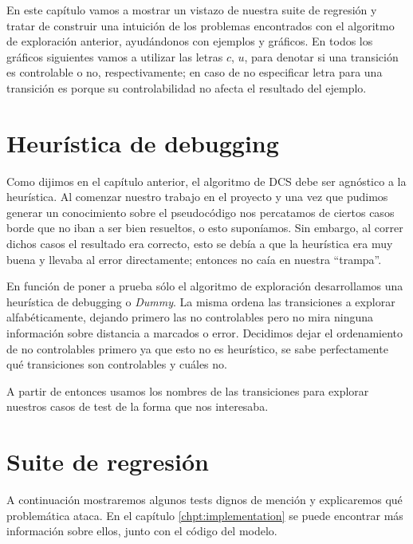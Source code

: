 En este capítulo vamos a mostrar un vistazo de nuestra suite de regresión y tratar de construir una intuición de los problemas encontrados con el algoritmo de exploración anterior, ayudándonos con ejemplos y gráficos. En todos los gráficos siguientes vamos a utilizar las letras $c$, $u$, para denotar si una transición es controlable o no, respectivamente; en caso de no especificar letra para una transición es porque su controlabilidad no afecta el resultado del ejemplo.

\section{Heurística de debugging}
Como dijimos en el capítulo anterior, el algoritmo de DCS debe ser agnóstico a la heurística. Al comenzar nuestro trabajo en el proyecto y una vez que pudimos generar un conocimiento sobre el pseudocódigo nos percatamos de ciertos casos borde que no iban a ser bien resueltos, o esto suponíamos. Sin embargo, al correr dichos casos el resultado era correcto, esto se debía a que la heurística era muy buena y llevaba al error directamente; entonces no caía en nuestra ``trampa''.

En función de poner a prueba sólo el algoritmo de exploración desarrollamos una heurística de debugging o \textit{Dummy}. La misma ordena las transiciones a explorar alfabéticamente, dejando primero las no controlables pero no mira ninguna información sobre distancia a marcados o error. Decidimos dejar el ordenamiento de no controlables primero ya que esto no es heurístico, se sabe perfectamente qué transiciones son controlables y cuáles no.

A partir de entonces usamos los nombres de las transiciones para explorar nuestros casos de test de la forma que nos interesaba. 

\section{Suite de regresión}
A continuación mostraremos algunos tests dignos de mención y explicaremos qué problemática ataca. En el capítulo \ref{chpt:implementation} se puede encontrar más información sobre ellos, junto con el código del modelo.

